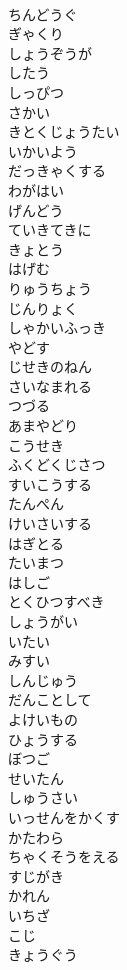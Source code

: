 \documentclass[8pt]{extreport}
\begin{document}
\begin{CJK}{UTF8}{min}
\\	ちんどうぐ
\\	ぎゃくり
\\	しょうぞうが
\\	したう
\\	しっぴつ
\\	さかい
\\	きとくじょうたい
\\	いかいよう
\\	だっきゃくする
\\	わがはい
\\	げんどう
\\	ていきてきに
\\	きょとう
\\	はげむ
\\	りゅうちょう
\\	じんりょく
\\	しゃかいふっき
\\	やどす
\\	じせきのねん
\\	さいなまれる
\\	つづる
\\	あまやどり
\\	こうせき
\\	ふくどくじさつ
\\	すいこうする
\\	たんぺん
\\	けいさいする
\\	はぎとる
\\	たいまつ
\\	はしご
\\	とくひつすべき
\\	しょうがい
\\	いたい
\\	みすい
\\	しんじゅう
\\	だんことして
\\	よけいもの
\\	ひょうする
\\	ぼつご
\\	せいたん
\\	しゅうさい
\\	いっせんをかくす
\\	かたわら
\\	ちゃくそうをえる
\\	すじがき
\\	かれん
\\	いちざ
\\	こじ
\\	きょうぐう

\end{CJK}
\end{document}
